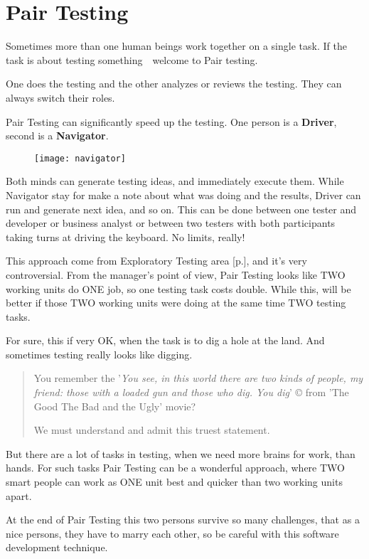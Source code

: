 \section{Pair Testing}
\label{sec:Pair Testing}

Sometimes more than one human beings work together on a single task. If the task is about testing something~\textemdash~welcome to Pair testing.

One does the testing and the other analyzes or reviews the testing. They can always switch their roles.

Pair Testing can significantly speed up the testing. One person is a \textbf{Driver}, second is a \textbf{Navigator}. 

\begin{figure}[!h]
\centering
\texttt{[image: navigator]}
\caption{}
\label{fig:Navigator}
\end{figure}

Both minds can generate testing ideas, and immediately execute them. While Navigator stay for make a note about what was doing and the results, Driver can run and generate next idea, and so on. This can be done between one tester and developer or business analyst or between two testers with both participants taking turns at driving the keyboard. No limits, really!

This approach come from Exploratory Testing area [p.\pageref{sec:Exploratory Testing}], and it's very controversial. From the manager's point of view, Pair Testing looks like TWO working units do ONE job, so one testing task costs double. While this, will be better if those TWO working units were doing at the same time TWO testing tasks. 

For sure, this if very OK, when the task is to dig a hole at the land. And sometimes testing really looks like digging.

\begin{quote}
You remember the '\textit{You see, in this world there are two kinds of people, my friend: those with a loaded gun and those who dig. You dig}' © from 'The Good The Bad and the Ugly' movie? 

We must understand and admit this truest statement.                                                                                                                                                                                                                                                 \end{quote} 

But there are a lot of tasks in testing, when we need more brains for work, than hands. For such tasks Pair Testing can be a wonderful approach, where TWO smart people can work as ONE unit best and quicker than two working units apart.

At the end of Pair Testing this two persons survive so many challenges, that as a nice persons, they have to marry each other, so be careful with this software development technique.
